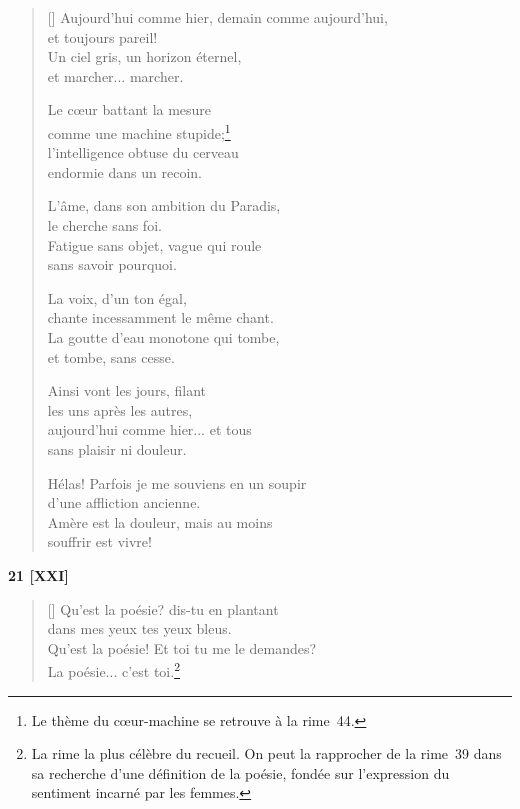 \documentclass[a4paper,12pt]{book}
\begin{document}
\settowidth{\versewidth}{Aujourd'hui comme hier, demain comme aujourd'hui,}

\begin{verse}[\versewidth]
  Aujourd'hui comme hier, demain comme aujourd'hui, \\
  et toujours pareil! \\
  Un ciel gris, un horizon éternel, \\
  et marcher... marcher.

  Le cœur battant la mesure \\
  comme une machine stupide;\footnote{Le thème du cœur-machine se
  retrouve à la rime~44.} \\
  l'intelligence obtuse du cerveau \\
  endormie dans un recoin.

  L'âme, dans son ambition du Paradis, \\
  le cherche sans foi. \\
  Fatigue sans objet, vague qui roule \\
  sans savoir pourquoi.

  La voix, d'un ton égal, \\
  chante incessamment le même chant. \\
  La goutte d'eau monotone qui tombe, \\
  et tombe, sans cesse.

  Ainsi vont les jours, filant \\
  les uns après les autres, \\
  aujourd'hui comme hier... et tous \\
  sans plaisir ni douleur.

  Hélas! Parfois je me souviens en un soupir \\
  d'une affliction ancienne. \\
  Amère est la douleur, mais au moins \\
  souffrir est vivre!
\end{verse}

\bigskip

\begin{center}
  \textbf{21 [XXI]}
\end{center}

\settowidth{\versewidth}{Qu'est la poésie! Et toi tu me le demandes?}

\begin{verse}[\versewidth]
  Qu'est la poésie? dis-tu en plantant \\
  dans mes yeux tes yeux bleus. \\
  Qu'est la poésie! Et toi tu me le demandes? \\
  La poésie... c'est toi.\footnote{La rime la plus célèbre du
  recueil. On peut la rapprocher de la rime~39 dans sa recherche d'une
  définition de la poésie, fondée sur l'expression du sentiment
  incarné par les femmes.}
\end{verse}
\end{document}
